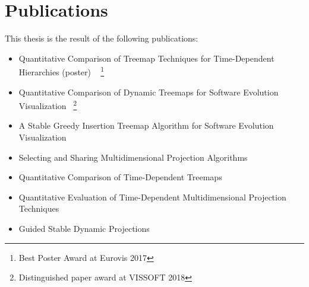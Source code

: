 \begingroup
\let\clearpage\relax
\let\cleardoublepage\relax
\let\cleardoublepage\relax

\manualmark
{} 

\chapter*{Publications}
This thesis is the result of the following publications:
\begin{itemize}
\item Quantitative Comparison of Treemap Techniques for Time-Dependent Hierarchies (poster) ~\citep{vernier17} \footnote{Best Poster Award at Eurovis 2017}
\item Quantitative Comparison of Dynamic Treemaps for Software Evolution Visualization~\citep{vernier18software} \footnote{Distinguished paper award at VISSOFT 2018}
\item A Stable Greedy Insertion Treemap Algorithm for Software Evolution Visualization~\citep{vernier18git}
\item Selecting and Sharing Multidimensional Projection Algorithms~\citep{EspadotoSharing}
\item Quantitative Comparison of Time-Dependent Treemaps~\citep{vernier_treemap}
\item Quantitative Evaluation of Time-Dependent Multidimensional Projection Techniques~\citep{Vernier2020}
\item Guided Stable Dynamic Projections~\citep{Vernier2021}
\end{itemize}


\endgroup
